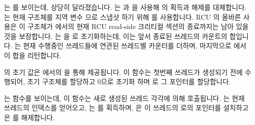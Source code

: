 \fi

\begin{fcvref}
 는  를 보이는데, 상당히 달라졌습니다.
 는  과  을 사용해
 의 획득과 해제를 대체합니다.
 는 현재  구조체를 지역 변수  으로 스냅샷
하기 위해  를 사용합니다.
RCU 의 올바른 사용은 이  구조체가  에서의 현재 RCU
read-side 크리티컬 섹션의 종료까지는 남아 있을 것을 보장합니다.
 는  을  로 초기화하는데, 이는 앞서 종료된
쓰레드의 카운트의 합입니다.
 는 현재 수행중인 쓰레드들에 연관된 쓰레드별 카운터를
더하며, 마지막으로  에서 이 합을 리턴합니다.
\end{fcvref}

\iffalse

\begin{fcvref}[ln:count:count_end_rcu:whole:read]
\Clnrefrange{b}{e} show \co{read_count()}, which has changed significantly.
\Clnref{rrl,rru} substitute \co{rcu_read_lock()} and
\co{rcu_read_unlock()} for acquisition and release of \co{final_mutex}.
\Clnref{deref} uses \co{rcu_dereference()} to snapshot the
current \co{countarray} structure into local variable \co{cap}.
Proper use of RCU will guarantee that this \co{countarray} structure
will remain with us through at least the end of the current RCU
read-side critical section at \clnref{rru}.
\Clnref{init} initializes \co{sum} to \co{cap->total}, which is the
sum of the counts of threads that have previously exited.
\Clnrefrange{add:b}{add:e} add up the per-thread counters corresponding
to currently
running threads, and, finally, \clnref{ret} returns the sum.
\end{fcvref}

\fi

\begin{fcvref}
 의 초기 값은  에서의  을
통해 제공됩니다.
이 함수는 첫번째 쓰레드가 생성되기 전에 수행되어, 초기 구조체를 할당하고 0으로
초기화 하며  로 그 포인터를 할당합니다.
\end{fcvref}

\begin{fcvref}
 는  함수를 보이는데, 이 함수는
새로 생성된 쓰레드 각각에 의해 호출됩니다.
 는 현재 쓰레드의 인덱스를 얻어오고,  는
 를 획득하며,  은 이 쓰레드의  로의
포인터를 설치하고  은  를 해제합니다.
\end{fcvref}

